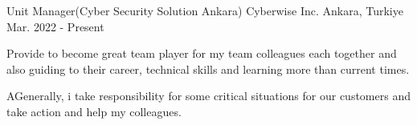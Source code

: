 

\begin{cventries}
  \cventry
    {Unit Manager(Cyber Security Solution Ankara)} %
    {Cyberwise Inc.} %
    {Ankara, Turkiye} %
    {Mar. 2022 - Present} %
    {
      \begin{cvitems} %
        \item {Provide to become great team player for my team colleagues each together and also guiding to their career, technical skills and learning more than current times.}
        \item {AGenerally, i take responsibility for some critical situations for our customers and take action and help my colleagues.}
      \end{cvitems}
    }


\end{cventries}
